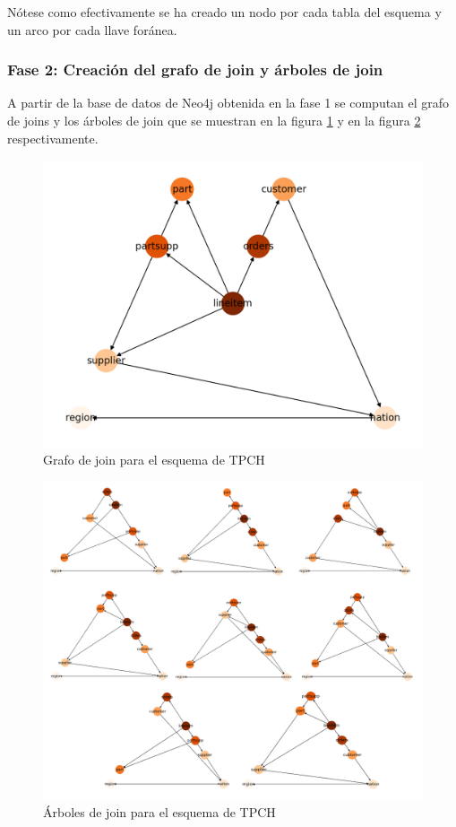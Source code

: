 N\'otese como efectivamente se ha creado un nodo por cada tabla del esquema y un arco por cada llave for\'anea.

\subsubsection{Fase 2: Creaci\'on del grafo de join y \'arboles de join}

A partir de la base de datos de Neo4j obtenida en la fase 1 se computan el grafo de joins y los \'arboles de 
join que se muestran en la figura \ref{fig:graphjoin2} y en la figura \ref{fig:jointree2} respectivamente. 

\begin{figure}[H]
  \centering
  \includegraphics[scale=0.6]{Graphics/joingraph2.png}
  \caption{Grafo de join para el esquema de TPCH}
  \label{fig:graphjoin2}
\end{figure}

\begin{figure}[H]
  \centering
  \includegraphics[scale=0.4]{Graphics/jointreesexp2.png}
  \caption{\'Arboles de join para el esquema de TPCH}
  \label{fig:jointree2}
\end{figure}

